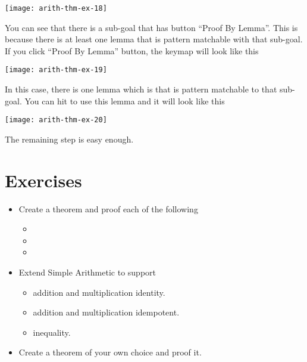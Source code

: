 \documentclass[master.tex]{subfiles}
\begin{document}
\texttt{[image: arith-thm-ex-18]}

\hspace{1ex}

You can see that there is a sub-goal that has button ``Proof By Lemma''. This is
because there is at least one lemma that is pattern matchable with that
sub-goal. If you click ``Proof By Lemma'' button, the keymap will look like this

\begin{center}
\texttt{[image: arith-thm-ex-19]}
\end{center}

In this case, there is one lemma which is  that is pattern
matchable to that sub-goal. You can hit  to use this lemma and it
will look like this

\texttt{[image: arith-thm-ex-20]}

The remaining step is easy enough.

\newpage
\section{Exercises}

\begin{itemize}
\item Create a theorem and proof each of the following
  \begin{itemize}
  \item {}
  \item {}
  \item {}
  \end{itemize}
\item Extend Simple Arithmetic to support
  \begin{itemize}
  \item addition and multiplication identity.
  \item addition and multiplication idempotent.
  \item inequality.
  \end{itemize}
\item Create a theorem of your own choice and proof it.
\end{itemize}
\end{document}
